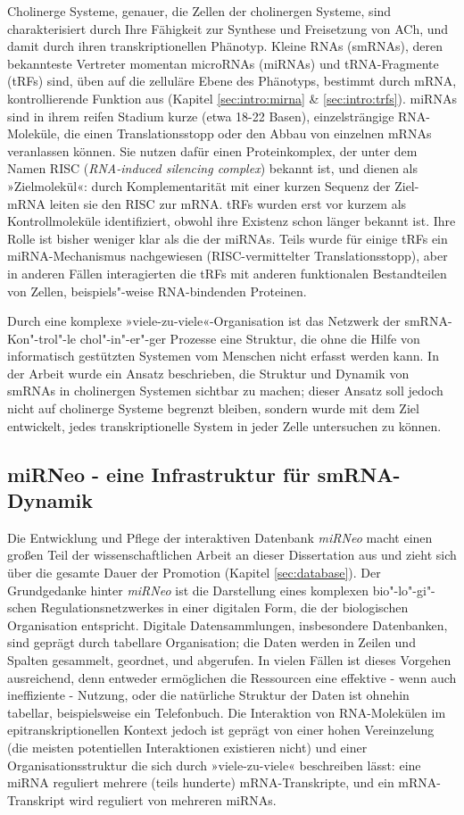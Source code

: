 Cholinerge Systeme, genauer, die Zellen der cholinergen Systeme, sind charakterisiert durch Ihre Fähigkeit zur Synthese und Freisetzung von ACh, und damit durch ihren transkriptionellen Phänotyp. Kleine RNAs (smRNAs), deren bekannteste Vertreter momentan microRNAs (miRNAs) und tRNA-Fragmente (tRFs) sind, üben auf die zelluläre Ebene des Phänotyps, bestimmt durch mRNA, kontrollierende Funktion aus (Kapitel \ref{sec:intro:mirna} \& \ref{sec:intro:trfs}). miRNAs sind in ihrem reifen Stadium kurze (etwa 18-22 Basen), einzelsträngige RNA-Moleküle, die einen Translationsstopp oder den Abbau von einzelnen mRNAs veranlassen können. Sie nutzen dafür einen Proteinkomplex, der unter dem Namen RISC (\emph{RNA-induced silencing complex}) bekannt ist, und dienen als »Zielmolekül«: durch Komplementarität mit einer kurzen Sequenz der Ziel-mRNA leiten sie den RISC zur mRNA. tRFs wurden erst vor kurzem als Kontrollmoleküle identifiziert, obwohl ihre Existenz schon länger bekannt ist. Ihre Rolle ist bisher weniger klar als die der miRNAs. Teils wurde für einige tRFs ein miRNA-Mechanismus nachgewiesen (RISC-vermittelter Translationsstopp), aber in anderen Fällen interagierten die tRFs mit anderen funktionalen Bestandteilen von Zellen, beispiels"-weise RNA-bindenden Proteinen.

Durch eine komplexe »viele-zu-viele«-Organisation ist das Netzwerk der smRNA-Kon"-trol"-le chol"-in"-er"-ger Prozesse eine Struktur, die ohne die Hilfe von informatisch gestützten Systemen vom Menschen nicht erfasst werden kann. In der Arbeit wurde ein Ansatz beschrieben, die Struktur und Dynamik von smRNAs in cholinergen Systemen sichtbar zu machen; dieser Ansatz soll jedoch nicht auf cholinerge Systeme begrenzt bleiben, sondern wurde mit dem Ziel entwickelt, jedes transkriptionelle System in jeder Zelle untersuchen zu können.

\subsection{miRNeo - eine Infrastruktur für smRNA-Dynamik}
Die Entwicklung und Pflege der interaktiven Datenbank \emph{miRNeo} macht einen großen Teil der wissenschaftlichen Arbeit an dieser Dissertation aus und zieht sich über die gesamte Dauer der Promotion (Kapitel \ref{sec:database}). Der Grundgedanke hinter \emph{miRNeo} ist die Darstellung eines komplexen bio"-lo"-gi"-schen Regulationsnetzwerkes in einer digitalen Form, die der biologischen Organisation entspricht. Digitale Datensammlungen, insbesondere Datenbanken, sind geprägt durch tabellare Organisation; die Daten werden in Zeilen und Spalten gesammelt, geordnet, und abgerufen. In vielen Fällen ist dieses Vorgehen ausreichend, denn entweder ermöglichen die Ressourcen eine effektive - wenn auch ineffiziente - Nutzung, oder die natürliche Struktur der Daten ist ohnehin tabellar, beispielsweise ein Telefonbuch. Die Interaktion von RNA-Molekülen im epitranskriptionellen Kontext jedoch ist geprägt von einer hohen Vereinzelung (die meisten potentiellen Interaktionen existieren nicht) und einer Organisationsstruktur die sich durch »viele-zu-viele« beschreiben lässt: eine miRNA reguliert mehrere (teils hunderte) mRNA-Transkripte, und ein mRNA-Transkript wird reguliert von mehreren miRNAs.

